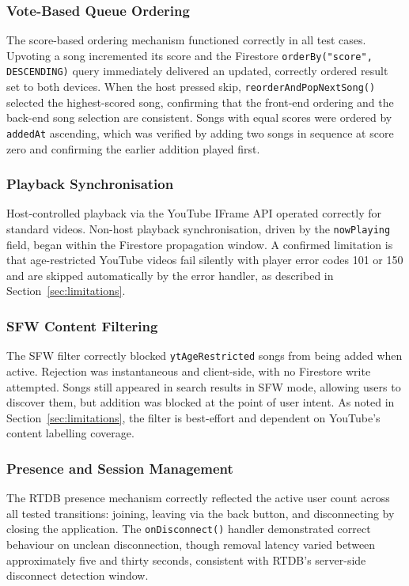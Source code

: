 \documentclass[pdflatex,sn-mathphys-num,iicol]{sn-jnl}
\theoremstyle{thmstyleone}%
\theoremstyle{thmstyletwo}%
\theoremstyle{thmstylethree}%
\begin{document}
\subsubsection{Vote-Based Queue Ordering}

The score-based ordering mechanism functioned correctly in all test cases. Upvoting
a song incremented its score and the Firestore \texttt{orderBy("score", DESCENDING)}
query immediately delivered an updated, correctly ordered result set to both devices.
When the host pressed skip, \texttt{reorderAndPopNextSong()} selected the
highest-scored song, confirming that the front-end ordering and the back-end song
selection are consistent. Songs with equal scores were ordered by \texttt{addedAt}
ascending, which was verified by adding two songs in sequence at score zero and
confirming the earlier addition played first.

\subsubsection{Playback Synchronisation}

Host-controlled playback via the YouTube IFrame API operated correctly for standard
videos. Non-host playback synchronisation, driven by the \texttt{nowPlaying} field,
began within the Firestore propagation window. A confirmed limitation is that
age-restricted YouTube videos fail silently with player error codes 101 or 150 and
are skipped automatically by the error handler, as described in
Section~\ref{sec:limitations}.

\subsubsection{SFW Content Filtering}

The SFW filter correctly blocked \texttt{ytAgeRestricted} songs from being added when
active. Rejection was instantaneous and client-side, with no Firestore write
attempted. Songs still appeared in search results in SFW mode, allowing users to
discover them, but addition was blocked at the point of user intent. As noted in
Section~\ref{sec:limitations}, the filter is best-effort and dependent on YouTube's
content labelling coverage.

\subsubsection{Presence and Session Management}

The RTDB presence mechanism correctly reflected the active user count across all
tested transitions: joining, leaving via the back button, and disconnecting by closing
the application. The \texttt{onDisconnect()} handler demonstrated correct behaviour
on unclean disconnection, though removal latency varied between approximately five
and thirty seconds, consistent with RTDB's server-side disconnect detection window.
\end{document}
